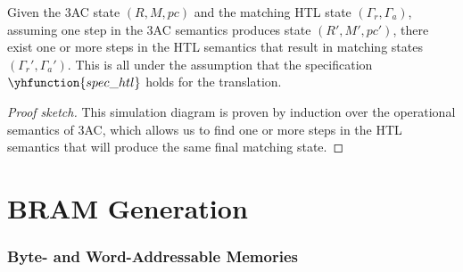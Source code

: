\begin{lemma}\label{lemma:simulation_diagram}
  Given the 3AC state $(R,M,\mathit{pc})$ and the matching HTL state
  $(\Gamma_{r}, \Gamma_{a})$, assuming one step in the 3AC semantics produces
  state $(R',M',\mathit{pc}')$, there exist one or more steps in the HTL
  semantics that result in matching states $(\Gamma_{r}', \Gamma_{a}')$.  This
  is all under the assumption that the specification $\yhfunction{spec\_{htl}}$
  holds for the translation.

  \begin{center}
  \end{center}
\end{lemma}

\begin{proof}[Proof sketch]
  This simulation diagram is proven by induction over the operational semantics
  of 3AC, which allows us to find one or more steps in the HTL semantics that
  will produce the same final matching state.
\end{proof}

\section{BRAM Generation}%
\label{sec:hg:bram-generation}

\subsubsection{Byte- and Word-Addressable Memories}

